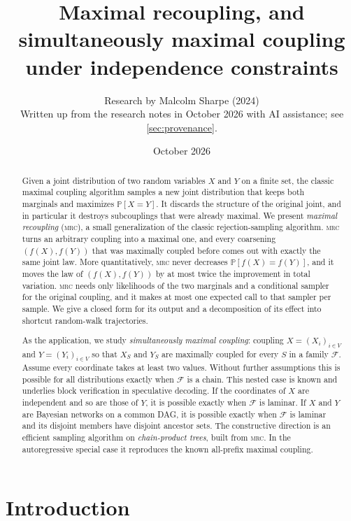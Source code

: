 \documentclass[11pt]{article}
\title{Maximal recoupling, and simultaneously maximal coupling\\ under independence constraints}
\author{Research by Malcolm Sharpe (2024)\\[2pt]
\small Written up from the research notes in October 2026 with AI assistance; see \cref{sec:provenance}.}
\date{October 2026}
\theoremstyle{definition}
\newcommand{\MRC}{\textnormal{\textsc{mrc}}}
\newcommand{\F}{\mathcal{F}}
\renewcommand{\Pr}{\mathbb{P}}
\begin{document}
\maketitle

\begin{abstract}
Given a joint distribution of two random variables $X$ and $Y$ on a finite set,
the classic maximal coupling algorithm samples a new joint distribution that
keeps both marginals and maximizes $\Pr[X=Y]$. It discards the structure of
the original joint, and in particular it destroys subcouplings that were
already maximal. We present \emph{maximal recoupling} (\MRC{}), a small
generalization of the classic rejection-sampling algorithm. \MRC{} turns an
arbitrary coupling into a maximal one, and every coarsening $(f(X),f(Y))$ that
was maximally coupled before comes out with exactly the same joint law. More
quantitatively, \MRC{} never decreases $\Pr[f(X)=f(Y)]$, and it moves the law of
$(f(X),f(Y))$ by at most twice the improvement in total variation. \MRC{} needs
only likelihoods of the two marginals and a conditional sampler for the original
coupling, and it makes at most one expected call to that sampler per sample. We
give a closed form for its output and a decomposition of its effect into
shortcut random-walk trajectories.

As the application, we study \emph{simultaneously maximal coupling}: coupling
$X=(X_i)_{i\in V}$ and $Y=(Y_i)_{i\in V}$ so that $X_S$ and $Y_S$ are maximally
coupled for every $S$ in a family $\F$. Assume every coordinate takes at least
two values. Without further assumptions this is possible for all distributions
exactly when $\F$ is a chain. This nested case is known and
underlies block verification in speculative decoding. If the coordinates of $X$
are independent and so are those of $Y$, it is possible exactly when $\F$ is
laminar. If $X$ and $Y$ are Bayesian networks on a common DAG, it is possible
exactly when $\F$ is laminar and its disjoint members have disjoint ancestor
sets. The constructive direction is an efficient sampling algorithm on
\emph{chain-product trees}, built from \MRC{}. In the autoregressive special case
it reproduces the known all-prefix maximal coupling.
\end{abstract}

\tableofcontents

\section{Introduction}
\end{document}
